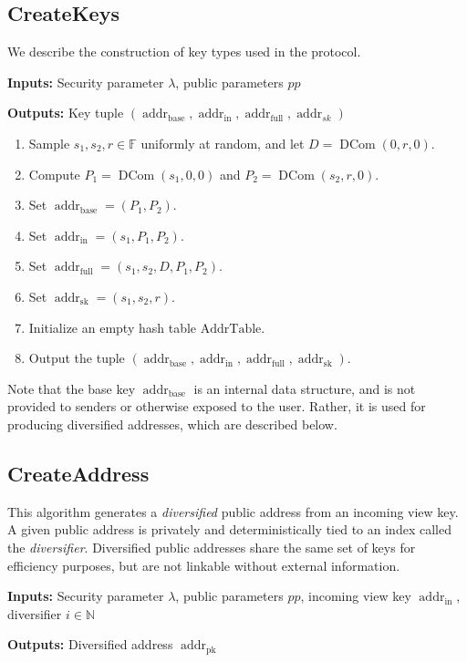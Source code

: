 \documentclass{llncs}
\newcommand{\F}{\mathbb{F}}
\newcommand{\addr}{\operatorname{addr}}
\newcommand{\dcom}{\operatorname{DCom}}
\begin{document}
\subsection{CreateKeys}

We describe the construction of key types used in the protocol.

\textbf{Inputs:} Security parameter $\lambda$, public parameters $pp$

\textbf{Outputs:} Key tuple $(\addr_{\text{base}}, \addr_{\text{in}}, \addr_{\text{full}}, \addr_{sk})$

\begin{enumerate}
\item Sample $s_1, s_2, r \in \F$ uniformly at random, and let $D = \dcom(0, r, 0)$.
\item Compute $P_1 = \dcom(s_1, 0, 0)$ and $P_2 = \dcom(s_2, r, 0)$.
\item Set $\addr_{\text{base}} = (P_1, P_2)$.
\item Set $\addr_{\text{in}} = (s_1, P_1, P_2)$.
\item Set $\addr_{\text{full}} = (s_1, s_2, D, P_1, P_2)$.
\item Set $\addr_{\text{sk}} = (s_1, s_2, r)$.
\item Initialize an empty hash table $\text{AddrTable}$.
\item Output the tuple $(\addr_{\text{base}}, \addr_{\text{in}}, \addr_{\text{full}}, \addr_{\text{sk}})$.
\end{enumerate}
Note that the base key $\addr_{\text{base}}$ is an internal data structure, and is not provided to senders or otherwise exposed to the user.
Rather, it is used for producing diversified addresses, which are described below.


\subsection{CreateAddress}

This algorithm generates a \textit{diversified} public address from an incoming view key.
A given public address is privately and deterministically tied to an index called the \textit{diversifier}.
Diversified public addresses share the same set of keys for efficiency purposes, but are not linkable without external information.

\textbf{Inputs:} Security parameter $\lambda$, public parameters $pp$, incoming view key $\addr_{\text{in}}$, diversifier $i \in \mathbb{N}$

\textbf{Outputs:} Diversified address $\addr_{\text{pk}}$
\end{document}
